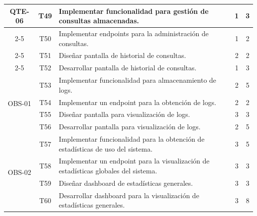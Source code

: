 \begin{longtable}[c]{|c|c|m{}|c|c|}
    \multirow{4}{*}{QTE-06} & T49 & Implementar funcionalidad para gestión de consultas almacenadas. & 1 & 3 \\
    \cline{2-5}
     & T50 & Implementar endpoints para la administración de consultas. & 1 & 2 \\
    \cline{2-5}
     & T51 & Diseñar pantalla de historial de consultas. & 2 & 2 \\
    \cline{2-5}
     & T52 & Desarrollar pantalla de historial de consultas. & 1 & 3 \\
    \hline
    
    
    \multirow{4}{*}{OBS-01} & T53 & Implementar funcionalidad para almacenamiento de logs. & 2 & 5 \\
    \cline{2-5}
     & T54 & Implementar un endpoint para la obtención de logs. & 2 & 2 \\
    \cline{2-5}
     & T55 & Diseñar pantalla para visualización de logs. & 3 & 3 \\
    \cline{2-5}
     & T56 & Desarrollar pantalla para visualización de logs. & 2 & 5 \\
    \hline   
    
    \multirow{4}{*}{OBS-02} & T57 & Implementar funcionalidad para la obtención de estadísticas de uso del sistema. & 3 & 5 \\
    \cline{2-5}
     & T58 & Implementar un endpoint para la visualización de estadísticas globales del sistema. & 3 & 3 \\
    \cline{2-5}
     & T59 & Diseñar dashboard de estadísticas generales. & 3 & 3 \\
    \cline{2-5}
     & T60 & Desarrollar dashboard para la visualización de estadísticas generales. & 3 & 8 \\
    \hline
    
\end{longtable}